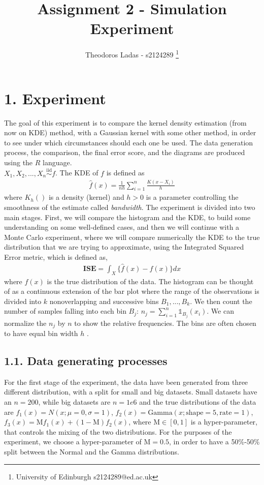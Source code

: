 \documentclass[fleqn, a4paper]{report}
\title{Assignment 2 - Simulation Experiment}
\author{
Theodoros Ladas - s2124289 
\footnote{University of Edinburgh s2124289@ed.ac.uk}
}
\date{\parbox{\linewidth}{\centering%
  February 4, 2021\endgraf\bigskip
  Coordinator: Miguel de Carvalho\endgraf\medskip
  Dept.\ of Mathematics \endgraf
  University of Edinburgh}}
\begin{document}
\maketitle

\section*{1. Experiment}

The goal of this experiment is to compare the kernel density estimation (from now on KDE) method, with a Gaussian kernel with some other method, in order to see under which circumstances should each one be used. The data generation process, the comparison, the final error score, and the diagrams are produced using the $R$ language.
\\
 $X_1,X_2,...,X_n \overset{\text{iid}}{\sim} f$. The KDE of $f$ is defined as
\begin{align*}
\hat{f}(x) = \frac{1}{nh}\sum_{i=1}^n \frac{K(x-X_i)}{h}
\end{align*}
where $K_h()$ is a density (kernel) and $h>0$ is a parameter controlling the smoothness of the estimate called \textit{bandwidth}.
The experiment is divided into two main stages. First, we will compare the histogram and the KDE, to build some understanding on some well-defined cases, and then we will continue with a Monte Carlo experiment, where we will compare numerically the KDE to the true distribution that we are trying to approximate, using the Integrated Squared Error metric, which is defined as,
\begin{align*}
\textbf{ISE} = \int_X \{\hat{f}(x) - f(x)\}dx
\end{align*}
where $f(x)$ is the true distribution of the data. The histogram can be thought of as a continuous extension of the bar plot where the range of the observations is divided into $k$ nonoverlapping and successive bins $B_1, . . . , B_k$. We then count the number of samples
falling into each bin $B_j$: $n_j = \sum_{i=1}^n \mathds{1}_{B_j}(x_i)$. We can normalize the $n_j$ by $n$ to show the relative frequencies. The bins are often chosen to have equal bin width $h$ \cite{arno_data_2020}.

\subsection*{1.1. Data generating processes}
For the first stage of the experiment, the data have been generated from three different distribution, with a split for small and big datasets. Small datasets have an $n=200$, while big datasets are $n=1e6$ and the true distributions of the data are $f_1(x) = N(x; \mu=0, \sigma=1)$, $f_2(x) = \text{Gamma}(x; \text{shape}=5, \text{rate}=1)$, 
$f_3(x) = \text{M}f_1(x) + (1-\text{M})f_2(x)$, where $\text{M} \in [0,1]$ is a hyper-parameter, that controls the mixing of the two distributions. For the purposes of the experiment, we choose a hyper-parameter of $\text{M} = 0.5$, in order to have a 50\%-50\% split between the Normal and the Gamma distributions. 
\end{document}
